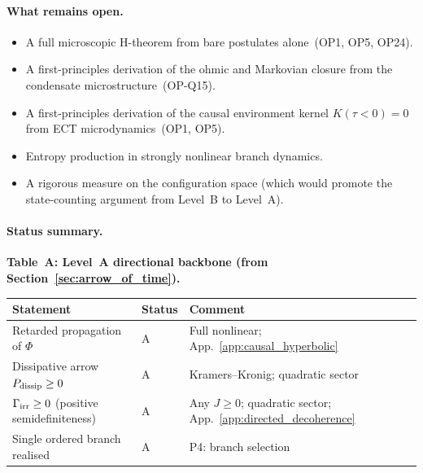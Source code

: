 \documentclass[11pt,a4paper]{article}
\numberwithin{equation}{section}
\begin{document}
\paragraph{What remains open.}
\begin{itemize}
  \item A full microscopic H-theorem from bare postulates
    alone~(OP1, OP5, OP24).
  \item A first-principles derivation of the ohmic and Markovian closure
    from the condensate microstructure~(OP-Q15).
  \item A first-principles derivation of the causal environment
    kernel $K(\tau<0)=0$ from ECT microdynamics~(OP1, OP5).
  \item Entropy production in strongly nonlinear branch dynamics.
  \item A rigorous measure on the configuration space (which would
    promote the state-counting argument from Level~B to Level~A).
\end{itemize}

\paragraph{Status summary.}

\noindent\textbf{Table~A: Level~A directional backbone
(from Section~\ref{sec:arrow_of_time}).}
\begin{center}
\renewcommand{\arraystretch}{1.2}
\begin{tabular}{p{6.2cm}p{2.0cm}p{4.8cm}}
\hline
Statement & Status & Comment \\
\hline
Retarded propagation of $\Phi$
  & A & Full nonlinear;
    App.~\ref{app:causal_hyperbolic} \\
Dissipative arrow $P_{\rm dissip}\geq 0$
  & A & Kramers--Kronig; quadratic sector \\
$\Gamma_{\rm irr}\geq 0$ (positive semidefiniteness)
  & A & Any $J\geq 0$; quadratic sector;
    App.~\ref{app:directed_decoherence} \\
Single ordered branch realised
  & A & P4: branch selection \\
\hline
\end{tabular}
\end{center}
\end{document}
